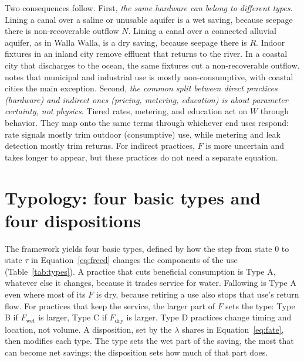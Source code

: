 \documentclass[11pt]{article}
\newcommand{\Fwet}{F_{\mathrm{wet}}}        %
\newcommand{\Fdry}{F_{\mathrm{dry}}}        %
\begin{document}
Two consequences follow. First, \emph{the same hardware can belong to different types}. Lining a canal over a saline or unusable aquifer is a wet saving, because seepage there is non-recoverable outflow $N$. Lining a canal over a connected alluvial aquifer, as in Walla Walla, is a dry saving, because seepage there is $R$. Indoor fixtures in an inland city remove effluent that returns to the river. In a coastal city that discharges to the ocean, the same fixtures cut a non-recoverable outflow. \citet{perry2012} notes that municipal and industrial use is mostly non-consumptive, with coastal cities the main exception. Second, \emph{the common split between direct practices (hardware) and indirect ones (pricing, metering, education) is about parameter certainty, not physics}. Tiered rates, metering, and education act on $W$ through behavior. They map onto the same terms through whichever end uses respond: rate signals mostly trim outdoor (consumptive) use, while metering and leak detection mostly trim returns. For indirect practices, $F$ is more uncertain and takes longer to appear, but these practices do not need a separate equation.

\section{Typology: four basic types and four dispositions}\label{sec:typology}

The framework yields four basic types, defined by how the step from state 0 to state $\tau$ in Equation~\eqref{eq:freed} changes the components of the use (Table~\ref{tab:types}). A practice that cuts beneficial consumption is Type A, whatever else it changes, because it trades service for water. Fallowing is Type A even where most of its $F$ is dry, because retiring a use also stops that use's return flow. For practices that keep the service, the larger part of $F$ sets the type: Type B if $\Fwet$ is larger, Type C if $\Fdry$ is larger. Type D practices change timing and location, not volume. A disposition, set by the $\lambda$ shares in Equation~\eqref{eq:fate}, then modifies each type. The type sets the wet part of the saving, the most that can become net savings; the disposition sets how much of that part does.
\end{document}
